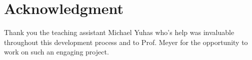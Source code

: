 %





\section*{Acknowledgment}

Thank you the teaching assistant Michael Yuhas who's help was invaluable throughout this development process and to Prof. Meyer for the opportunity to work on such an engaging project.





%








